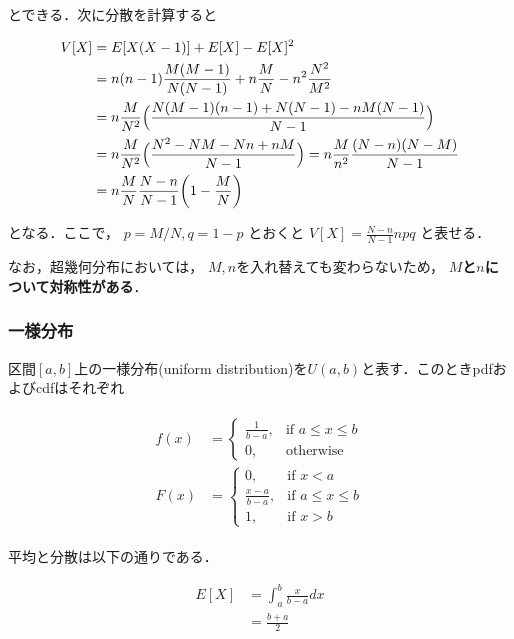 \documentclass[12pt,a4j,draft]{jarticle}
\numberwithin{equation}{section}
\theoremstyle{break}
\begin{document}
とできる．次に分散を計算すると

\begin{align}
    V[X] &= E[X(X-1)] + E[X] - E[X]^2 \\
    &= n(n-1) \frac{M(M-1)}{N(N-1)} + n \frac MN - n^2 \frac{N^2}{M^2} \\
    &= n \frac{M}{N^2} \Bigl( \frac{N(M-1)(n-1) + N(N-1) - nM(N-1)}{N-1} \Bigr) \\
    &= n \frac{M}{N^2} \Bigl( \frac{N^2 - NM-Nn+nM}{N-1} \Bigr) = n \frac{M}{n^2} \frac{(N-n)(N-M)}{N-1}\\
    &=n \frac{M}{N} \frac{N-n}{N-1} \biggl( 1 - \frac{M}{N} \biggr)
\end{align}

となる．ここで， $p = M/N, q = 1 - p$ とおくと $V[X] = \frac{\displaystyle N-n}{\displaystyle N-1} npq$ と表せる．

なお，超幾何分布においては， $M,n$を入れ替えても変わらないため， \textbf{$M$と$n$について対称性がある}．

\subsubsection{一様分布}

区間$[a,b]$上の一様分布(uniform distribution)を$U(a,b)$と表す．このときpdfおよびcdfはそれぞれ

\begin{align}
    \label{eq:uniform-pdf-cdf}
    \begin{aligned}
        f(x) &= \begin{cases}
            \frac{\displaystyle 1}{\displaystyle b-a}, & \text{if } a \leq x \leq b \\
            0, & \text{otherwise}
        \end{cases} \\
        F(x) &= \begin{cases}
            0, & \text{if } x < a \\
            \frac{\displaystyle x-a}{\displaystyle b-a}, & \text{if } a \leq x \leq b \\
            1, & \text{if } x > b
        \end{cases}
    \end{aligned}
\end{align}

平均と分散は以下の通りである．

\begin{align}
    E[X] &= \int_a^b \frac{x}{b-a} dx \\
    &= \frac{b+a}{2}
\end{align}
\end{document}

